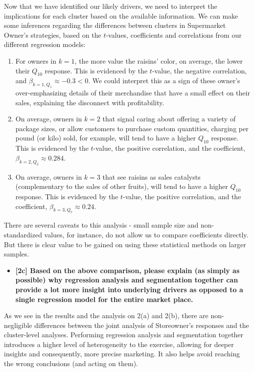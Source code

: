 \documentclass[10pt, oneside,spanish]{article}
\begin{document}
Now that we have identified our likely drivers, we need to interpret the implications for each cluster based on the available information. We can make some inferences regarding the differences between clusters in Supermarket Owner's strategies, based on the $t$-values, coefficients and correlations from our different regression models:
\begin{enumerate}
\item For owners in $k=1$, the more value the raisins' color, on average, the lower their $Q_{10}$ response. This is evidenced by the $t$-value, the negative correlation, and  $\beta_{k=1,Q_{1}} \approx -0.3 < 0$. We could interpret this as a sign of these owner's over-emphasizing details of their merchandise that have a small effect on their sales, explaining the disconnect with profitability.
\item On average, owners in $k=2$ that signal caring about offering a variety of package sizes, or allow customers to purchase custom quantities, charging per pound (or kilo) sold, for example, will tend to have a higher $Q_{10}$ response. This is evidenced by the $t$-value, the positive correlation, and the coefficient, $\beta_{k=2,Q_{3}} \approx 0.284$. 
\item  On average, owners in $k=3$ that see raisins as sales catalysts (complementary to the sales of other fruits), will tend to have a higher $Q_{10}$ response. This is evidenced by the $t$-value, the positive correlation, and the coefficient, $\beta_{k=3,Q_{7}} \approx 0.24$. 
\end{enumerate}
 
 There are several caveats to this analysis - small sample size and non-standardized values, for instance, do not allow us to compare coefficients directly. But there is clear value to be gained on using these statistical methods on larger samples. 


\begin{itemize}
\item \textbf{[2c] Based on the above comparison, please explain (as simply as possible) why regression analysis and segmentation together can provide a lot more insight into underlying drivers as opposed to a single regression model for the entire market place. }
\end{itemize}


As we see in the results and the analysis on 2(a) and 2(b), there are non-negligible differences between the joint analysis of Storeowner's responses and the cluster-level analyses. Performing regression analysis and segmentation together introduces a higher level of heterogeneity to the exercise, allowing for deeper insights and consequently, more precise marketing. It also helps avoid reaching the wrong conclusions (and acting on them). 
 
\end{document}
